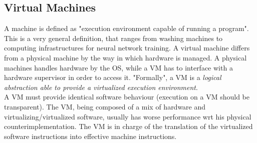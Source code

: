 \documentclass[10pt,a4paper]{article}
\begin{document}
			\subsection{Virtual Machines}
				A machine is defined as "execution environment capable of running a program". This is a very general definition, that ranges from washing machines to computing infrastructures for neural network training. A virtual machine differs from a physical machine by the way in which hardware is managed. A physical machines handles hardware by the OS, while a VM has to interface with a hardware supervisor in order to access it. "Formally", a VM is a \emph{logical abstraction able to provide a virtualized execution environment}.\\
				A VM must provide identical software behaviour (execution on a VM should be transparent). The VM, being composed of a mix of hardware and virtualizing/virtualized software, usually has worse performance wrt his physical counterimplementation. The VM is in charge of the translation of the virtualized software instructions into effective machine instructions. 
	
\end{document}
